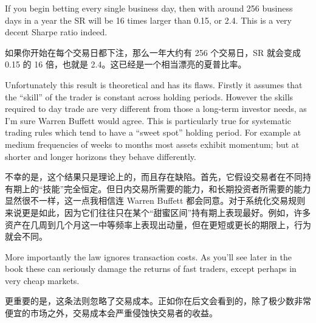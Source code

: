 \bipairgap

\begin{englishblock} If you begin betting every single business day, then with around 256 business days in a year the SR will be 16 times larger than 0.15, or 2.4. This is a very decent Sharpe ratio indeed. \end{englishblock}

\begin{chineseblock}如果你开始在每个交易日都下注，那么一年大约有 256 个交易日，SR 就会变成 0.15 的 16 倍，也就是 2.4。这已经是一个相当漂亮的夏普比率。\end{chineseblock}

\bipairgap

\begin{englishblock} Unfortunately this result is theoretical and has its flaws. Firstly it assumes that the ``skill'' of the trader is constant across holding periods. However the skills required to day trade are very different from those a long-term investor needs, as I'm sure Warren Buffett would agree. This is particularly true for systematic trading rules which tend to have a ``sweet spot'' holding period. For example at medium frequencies of weeks to months most assets exhibit momentum; but at shorter and longer horizons they behave differently. \end{englishblock}

\begin{chineseblock}不幸的是，这个结果只是理论上的，而且存在缺陷。首先，它假设交易者在不同持有期上的“技能”完全恒定。但日内交易所需要的能力，和长期投资者所需要的能力显然很不一样，这一点我相信连 Warren Buffett 都会同意。对于系统化交易规则来说更是如此，因为它们往往只在某个“甜蜜区间”持有期上表现最好。例如，许多资产在几周到几个月这一中等频率上表现出动量，但在更短或更长的期限上，行为就会不同。\end{chineseblock}

\bipairgap

\begin{englishblock} More importantly the law ignores transaction costs. As you'll see later in the book these can seriously damage the returns of fast traders, except perhaps in very cheap markets. \end{englishblock}

\begin{chineseblock}更重要的是，这条法则忽略了交易成本。正如你在后文会看到的，除了极少数非常便宜的市场之外，交易成本会严重侵蚀快交易者的收益。\end{chineseblock}

